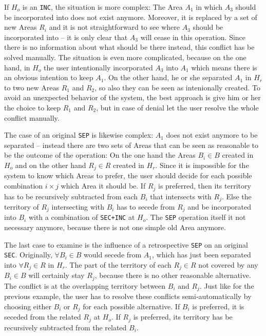 If $H_o$ is an \texttt{INC}, the situation is more complex: The Area $A_1$ in which $A_3$ should be incorporated into does not exist anymore. Moreover, it is replaced by a set of new Areas $R_i$ and it is not straightforward to see where $A_3$ should be incorporated into -- it is only clear that $A_3$ will cease in this operation. Since there is no information about what should be there instead, this conflict has be solved manually. The situation is even more complicated, because on the one hand, in $H_o$ the user intentionally incorporated $A_3$ into $A_1$ which means there is an obvious intention to keep $A_1$. On the other hand, he or she separated $A_1$ in $H_r$ to two new Areas $R_1$ and $R_2$, so also they can be seen as intenionally created. To avoid an unexpected behavior of the system, the best approach is give him or her the choice to keep $R_1$ and $R_2$, but in case of denial let the user resolve the whole conflict manually.

The case of an original \texttt{SEP} is likewise complex: $A_1$ does not exist anymore to be separated -- instead there are two sets of Areas that can be seen as reasonable to be the outcome of the operation: On the one hand the Areas $B_i \in B$ created in $H_o$ and on the other hand $R_j \in R$ created in $H_r$. Since it is impossible for the system to know which Areas to prefer, the user should decide for each possible combination $i \times j$ which Area it should be. If $R_j$ is preferred, then its territory has to be recursively subtracted from each $B_i$ that intersects with $R_j$. Else the territory of $R_j$ intersecting with $B_i$ has to secede from $R_j$ and be incorporated into $B_i$ with a combination of \texttt{SEC+INC} at $H_o$. The \texttt{SEP} operation itself it not necessary anymore, because there is not one simple old Area anymore.

The last case to examine is the influence of a retrospective \texttt{SEP} on an original \texttt{SEC}. Originally, $\forall B_i \in B$ would secede from $A_1$, which has just been separated into $\forall R_j \in R$ in $H_r$. The part of the territory of each $R_j \in R$ not covered by any $B_i \in B$ will certainly stay $R_j$, because there is no other reasonable alternative. The conflict is at the overlapping territory between $B_i$ and $R_j$. Just like for the previous example, the user has to resolve these conflicts semi-automatically by choosing either $B_i$ or $R_j$ for each possible alternative. If $B_i$ is preferred, it is seceded from the related $R_j$ at $H_o$. If $R_j$ is preferred, its territory has be recursively subtracted from the related $B_i$.


